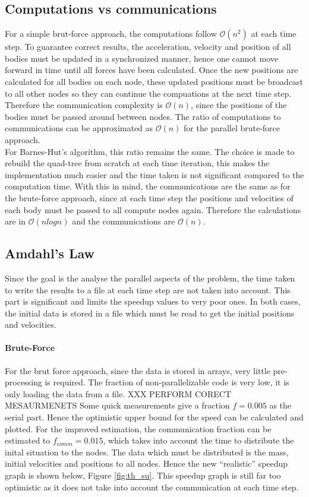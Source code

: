 \subsection{Computations vs communications}
For a simple brut-force approach, the computations follow $\mathcal{O}(n^2)$ at each time step. To guarantee correct results, the acceleration, velocity and position of all bodies must be updated in a synchronized manner, hence one cannot move forward in time until all forces have been calculated. Once the new positions are calculated for all bodies on each node, these updated positions must be broadcast to all other nodes so they can continue the compuations at the next time step. Therefore the communication complexity is $\mathcal{O}(n)$, since the positions of the bodies must be passed around between nodes. The ratio of computations to communications can be approximated as $\mathcal{O}(n)$ for the parallel brute-force approach.\\
For Barnes-Hut's algorithm, this ratio remains the same. The choice is made to rebuild the quad-tree from scratch at each time iteration, this makes the implementation much easier and the time taken is not significant compared to the computation time. With this in mind, the communications are the same as for the brute-force approach, since at each time step the positions and velocities of each body must be passed to all compute nodes again. Therefore the calculations are in $\mathcal{O}(nlogn)$ and the communications are $\mathcal{O}(n)$.
\subsection{Amdahl's Law}
Since the goal is the analyse the parallel aspects of the problem, the time taken to write the results to a file at each time step are not taken into account. This part is significant and limits the speedup values to very poor ones. In both cases, the initial data is stored in a file which must be read to get the initial positions and velocities.  
\paragraph{Brute-Force} For the brut force approach, since the data is stored in arrays, very little pre-processing is required. The fraction of non-parallelizable code is very low, it is only loading the data from a file. XXX PERFORM CORECT MESAURMENETS Some quick measurements give a fraction $f=0.005$ as the serial part. Hence the optimistic upper bound for the speed can be calculated and plotted. For the improved estimation, the communication fraction can be estimated to $f_{comm} = 0.015$, which takes into account the time to distribute the inital situation to the nodes. The data which must be distributed is the mass, initial velocities and positions to all nodes. Hence the new ``realistic'' speedup graph is shown below, Figure \ref{fig:th_su}. This speedup graph is still far too optimistic as it does not take into account the communication at each time step.\\

